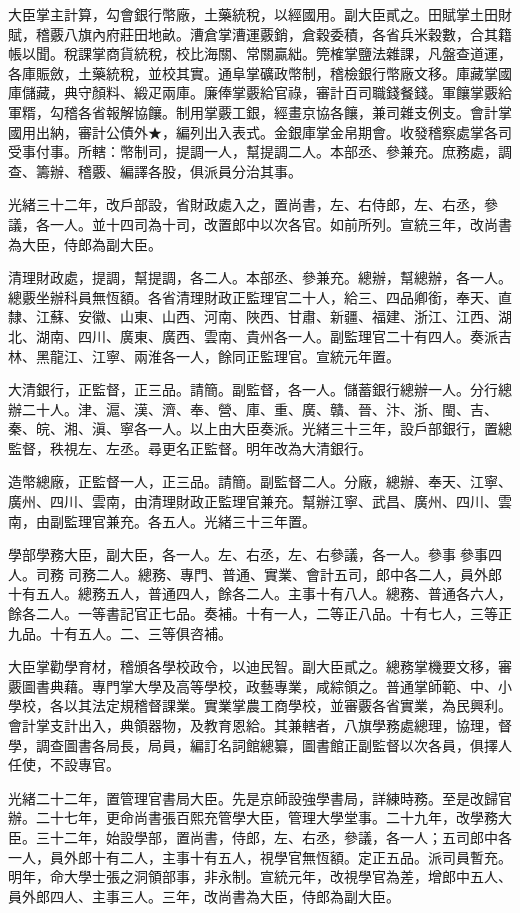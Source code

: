 \begin{pinyinscope}
大臣掌主計算，勾會銀行幣廠，土藥統稅，以經國用。副大臣貳之。田賦掌土田財賦，稽覈八旗內府莊田地畝。漕倉掌漕運覈銷，倉穀委積，各省兵米穀數，合其籍帳以聞。稅課掌商貨統稅，校比海關、常關贏絀。筦榷掌鹽法雜課，凡盤查道運，各庫賑斂，土藥統稅，並校其實。通阜掌礦政幣制，稽檢銀行幣廠文移。庫藏掌國庫儲藏，典守顏料、緞疋兩庫。廉俸掌覈給官祿，審計百司職錢餐錢。軍饟掌覈給軍糈，勾稽各省報解協饟。制用掌覈工銀，經畫京協各饟，兼司雜支例支。會計掌國用出納，審計公債外★，編列出入表式。金銀庫掌金帛期會。收發稽察處掌各司受事付事。所轄：幣制司，提調一人，幫提調二人。本部丞、參兼充。庶務處，調查、籌辦、稽覈、編譯各股，俱派員分治其事。

光緒三十二年，改戶部設，省財政處入之，置尚書，左、右侍郎，左、右丞，參議，各一人。並十四司為十司，改置郎中以次各官。如前所列。宣統三年，改尚書為大臣，侍郎為副大臣。

清理財政處，提調，幫提調，各二人。本部丞、參兼充。總辦，幫總辦，各一人。總覈坐辦科員無恆額。各省清理財政正監理官二十人，給三、四品卿銜，奉天、直隸、江蘇、安徽、山東、山西、河南、陜西、甘肅、新疆、福建、浙江、江西、湖北、湖南、四川、廣東、廣西、雲南、貴州各一人。副監理官二十有四人。奏派吉林、黑龍江、江寧、兩淮各一人，餘同正監理官。宣統元年置。

大清銀行，正監督，正三品。請簡。副監督，各一人。儲蓄銀行總辦一人。分行總辦二十人。津、滬、漢、濟、奉、營、庫、重、廣、贛、晉、汴、浙、閩、吉、秦、皖、湘、滇、寧各一人。以上由大臣奏派。光緒三十三年，設戶部銀行，置總監督，秩視左、左丞。尋更名正監督。明年改為大清銀行。

造幣總廠，正監督一人，正三品。請簡。副監督二人。分廠，總辦、奉天、江寧、廣州、四川、雲南，由清理財政正監理官兼充。幫辦江寧、武昌、廣州、四川、雲南，由副監理官兼充。各五人。光緒三十三年置。

學部學務大臣，副大臣，各一人。左、右丞，左、右參議，各一人。參事參事四人。司務司務二人。總務、專門、普通、實業、會計五司，郎中各二人，員外郎十有五人。總務五人，普通四人，餘各二人。主事十有八人。總務、普通各六人，餘各二人。一等書記官正七品。奏補。十有一人，二等正八品。十有七人，三等正九品。十有五人。二、三等俱咨補。

大臣掌勸學育材，稽頒各學校政令，以迪民智。副大臣貳之。總務掌機要文移，審覈圖書典藉。專門掌大學及高等學校，政藝專業，咸綜領之。普通掌師範、中、小學校，各以其法定規稽督課業。實業掌農工商學校，並審覈各省實業，為民興利。會計掌支計出入，典領器物，及教育恩給。其兼轄者，八旗學務處總理，協理，督學，調查圖書各局長，局員，編訂名詞館總纂，圖書館正副監督以次各員，俱擇人任使，不設專官。

光緒二十二年，置管理官書局大臣。先是京師設強學書局，詳練時務。至是改歸官辦。二十七年，更命尚書張百熙充管學大臣，管理大學堂事。二十九年，改學務大臣。三十二年，始設學部，置尚書，侍郎，左、右丞，參議，各一人；五司郎中各一人，員外郎十有二人，主事十有五人，視學官無恆額。定正五品。派司員暫充。明年，命大學士張之洞領部事，非永制。宣統元年，改視學官為差，增郎中五人、員外郎四人、主事三人。三年，改尚書為大臣，侍郎為副大臣。


\end{pinyinscope}

